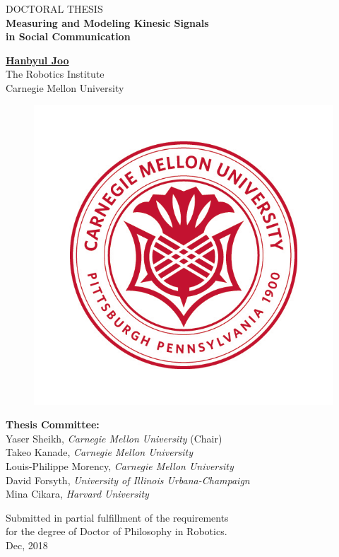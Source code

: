 \begin{center}
\textsc{\Large DOCTORAL  THESIS}\\[1cm]	
{ \huge \bfseries Measuring and Modeling Kinesic Signals \\in Social Communication}\\
\vspace{1cm}
{\Large \href{http://cs.cmu.edu/~hanbyulj}{\textbf{Hanbyul Joo}}\\
\vspace{0.5cm}
The Robotics Institute\\
Carnegie Mellon University\\
\begin{figure}[h]
	\centering
	\includegraphics[trim=0 0 0 0, clip=true, width=0.2\columnwidth]{figures/cmu_logo}
\end{figure}
\textbf{Thesis Committee:}\\
\large
Yaser Sheikh, \emph{Carnegie Mellon University} (Chair)\\
Takeo Kanade, \emph{Carnegie Mellon University} \\ 
Louis-Philippe Morency, \emph{Carnegie Mellon University}\\ 
David Forsyth, \emph{University of Illinois Urbana-Champaign}\\
Mina Cikara, \emph{Harvard University} 
}

\vspace{1.5cm}
Submitted in partial fulfillment of the requirements\\
for the degree of Doctor of Philosophy in Robotics.\\
Dec, 2018\\
\vspace{50pt}
\vspace{10pt}


\end{center}

\pagebreak